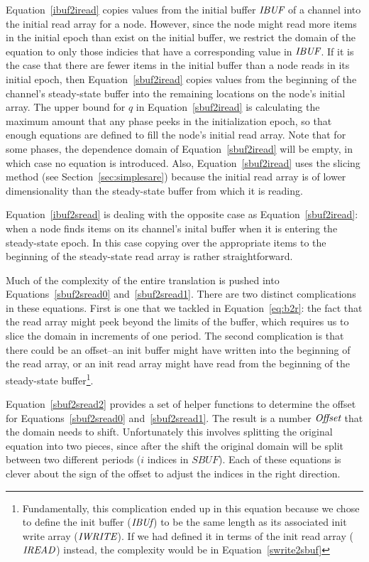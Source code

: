Equation~\ref{ibuf2iread} copies values from the initial buffer
$\mbox{\it IBUF}$ of a channel into the initial read array for a node.
However, since the node might read more items in the initial epoch
than exist on the initial buffer, we restrict the domain of the
equation to only those indicies that have a corresponding value in
$\mbox{\it IBUF}$.  If it is the case that there are fewer items in the
initial buffer than a node reads in its initial epoch, then
Equation~\ref{sbuf2iread} copies values from the beginning of the
channel's steady-state buffer into the remaining locations on the
node's initial array.  The upper bound for $q$ in
Equation~\ref{sbuf2iread} is calculating the maximum amount that any
phase peeks in the initialization epoch, so that enough equations are
defined to fill the node's initial read array.  Note that for some
phases, the dependence domain of Equation~\ref{sbuf2iread} will be
empty, in which case no equation is introduced.  Also,
Equation~\ref{sbuf2iread} uses the slicing method (see
Section~\ref{sec:simplesare}) because the initial read array is of
lower dimensionality than the steady-state buffer from which it is
reading.

Equation~\ref{ibuf2sread} is dealing with the opposite case as
Equation~\ref{sbuf2iread}: when a node finds items on its channel's
inital buffer when it is entering the steady-state epoch.  In this
case copying over the appropriate items to the beginning of the
steady-state read array is rather straightforward.

Much of the complexity of the entire translation is pushed into
Equations~\ref{sbuf2sread0} and~\ref{sbuf2sread1}.  There are two
distinct complications in these equations.  First is one that we
tackled in Equation~\ref{eq:b2r}: the fact that the read array might
peek beyond the limits of the buffer, which requires us to slice the
domain in increments of one period.  The second complication is that
there could be an offset--an init buffer might have written into the
beginning of the read array, or an init read array might have read
from the beginning of the steady-state buffer\footnote{Fundamentally,
this complication ended up in this equation because we chose to define
the init buffer ($\mbox{\it IBUf}$) to be the same length as its associated
init write array ($\mbox{\it IWRITE}$).  If we had defined it in terms of
the init read array ($\mbox{\it IREAD}$) instead, the complexity would be in
Equation~\ref{swrite2sbuf}}.

Equation~\ref{sbuf2sread2} provides a set of helper functions to
determine the offset for Equations~\ref{sbuf2sread0}
and~\ref{sbuf2sread1}.  The result is a number $\mbox{\it Offset}$ that the
domain needs to shift.  Unfortunately this involves splitting the
original equation into two pieces, since after the shift the original
domain will be split between two different periods ($i$ indices in
$SBUF$).  Each of these equations is clever about the sign of the
offset to adjust the indices in the right direction.